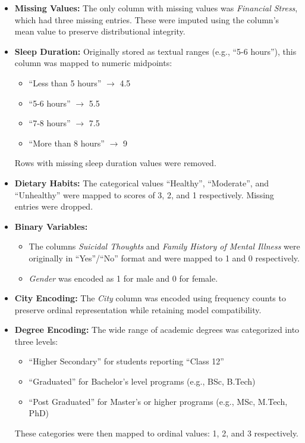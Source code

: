 \documentclass{article} %
\begin{document}
\begin{itemize}
    \item \textbf{Missing Values:} The only column with missing values was \textit{Financial Stress}, which had three missing entries. These were imputed using the column's mean value to preserve distributional integrity.

    \item \textbf{Sleep Duration:} Originally stored as textual ranges (e.g., ``5-6 hours''), this column was mapped to numeric midpoints:
    \begin{itemize}
        \item ``Less than 5 hours'' $\rightarrow$ 4.5
        \item ``5-6 hours'' $\rightarrow$ 5.5
        \item ``7-8 hours'' $\rightarrow$ 7.5
        \item ``More than 8 hours'' $\rightarrow$ 9
    \end{itemize}
    Rows with missing sleep duration values were removed.

    \item \textbf{Dietary Habits:} The categorical values ``Healthy'', ``Moderate'', and ``Unhealthy'' were mapped to scores of 3, 2, and 1 respectively. Missing entries were dropped.

    \item \textbf{Binary Variables:} 
    \begin{itemize}
        \item The columns \textit{Suicidal Thoughts} and \textit{Family History of Mental Illness} were originally in ``Yes''/``No'' format and were mapped to 1 and 0 respectively.
        \item \textit{Gender} was encoded as 1 for male and 0 for female.
    \end{itemize}

    \item \textbf{City Encoding:} The \textit{City} column was encoded using frequency counts to preserve ordinal representation while retaining model compatibility.

    \item \textbf{Degree Encoding:} The wide range of academic degrees was categorized into three levels:
    \begin{itemize}
        \item ``Higher Secondary'' for students reporting ``Class 12''
        \item ``Graduated'' for Bachelor's level programs (e.g., BSc, B.Tech)
        \item ``Post Graduated'' for Master's or higher programs (e.g., MSc, M.Tech, PhD)
    \end{itemize}
    These categories were then mapped to ordinal values: 1, 2, and 3 respectively.
\end{itemize}
\end{document}
